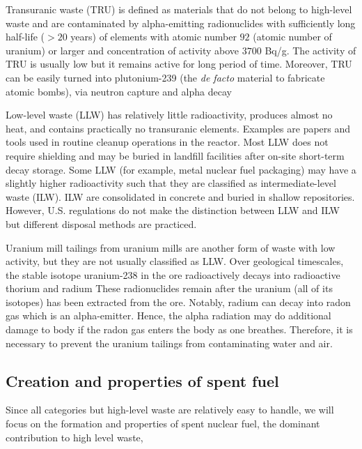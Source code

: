 \documentclass[nofootinbib,preprint,aps]{revtex4-1}
\begin{document}
    Transuranic waste (TRU) is defined as materials that do not belong to high-level waste and are
    contaminated by alpha-emitting radionuclides with
    sufficiently long half-life ($>20$ years) of elements with atomic number $92$ (atomic number of uranium)
    or larger and concentration of activity above $3700$ Bq/g.\cite{j83,s01} The activity
    of TRU is usually low but it remains active for long period of time. Moreover, TRU can be easily turned
    into plutonium-239 (the {\it de facto} material to fabricate atomic bombs), via neutron capture and alpha decay

    Low-level waste (LLW) has relatively little radioactivity, produces almost no heat,
    and contains practically no
    transuranic elements. Examples are papers and tools used in routine cleanup operations in the reactor.
    Most LLW does not require shielding and may be buried in landfill 
    facilities after on-site short-term decay storage.
    Some LLW (for example, metal nuclear fuel packaging) may have a slightly
    higher radioactivity such that they are classified
    as intermediate-level waste (ILW). ILW are consolidated in concrete and buried in shallow
    repositories.\cite{s01} However, U.S. regulations do not make the distinction
    between LLW and ILW but different disposal methods are practiced.\cite{nrc09, s01}

    Uranium mill tailings from uranium mills are another form of waste with low activity, but
    they are not usually classified as LLW.
    Over geological timescales, the stable isotope uranium-238 
    in the ore radioactively decays into radioactive thorium and radium 
    These radionuclides remain after the uranium (all of its isotopes)
    has been extracted from the ore. Notably, radium
    can decay into radon gas which is an alpha-emitter. Hence, the alpha radiation may do additional
    damage to body if the radon gas enters the body as one breathes.
    Therefore, it is necessary to prevent the uranium tailings
    from contaminating water and air.
    \subsection{Creation and properties of spent fuel}
    Since all categories but high-level waste are relatively easy to handle,
    we will focus on the formation and
    properties of spent nuclear fuel, the dominant contribution to high level waste,
    \label{sec:waste:spentfuel}
\end{document}
